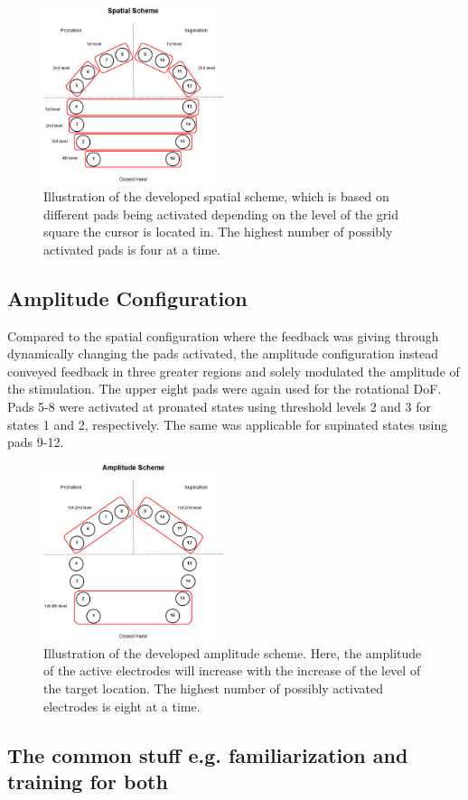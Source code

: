 \begin{figure}[H]                 
	\includegraphics[width=0.47\textwidth]{figures/El_array_spatial}  
	\caption{Illustration of the developed spatial scheme, which is based on different pads being activated depending on the level of the grid square the cursor is located in. The highest number of possibly activated pads is four at a time.}
	\label{fig:spatial} 
\end{figure}


\subsection{Amplitude Configuration}

Compared to the spatial configuration where the feedback was giving through dynamically changing the pads activated, the amplitude configuration instead conveyed feedback in three greater regions and solely modulated the amplitude of the stimulation. The upper eight pads were again used for the rotational DoF. Pads 5-8 were activated at pronated states using threshold levels 2 and 3 for states 1 and 2, respectively. The same was applicable for supinated states using pads 9-12. \\
      



\begin{figure}[H]                 
	\includegraphics[width=0.47\textwidth]{figures/El_array_amplitude}  
	\caption{Illustration of the developed amplitude scheme. Here, the amplitude of the active electrodes will increase with the increase of the level of the target location. The highest number of possibly activated electrodes is eight at a time.}
	\label{fig:amplitude} 
\end{figure}




\subsection{The common stuff e.g. familiarization and training for both}